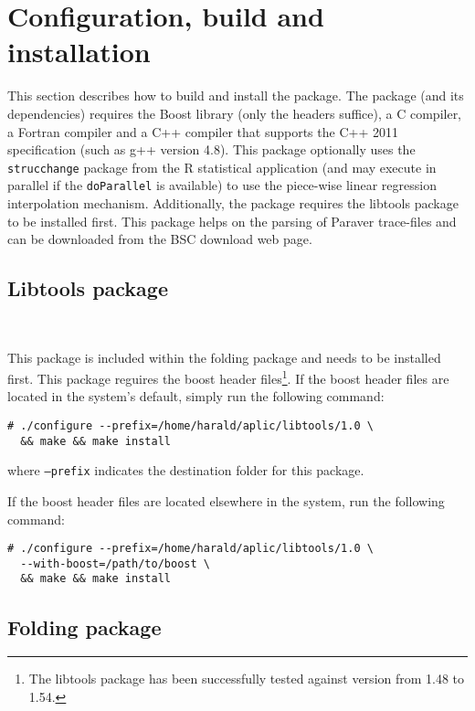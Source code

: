 

\section{Configuration, build and installation}

This section describes how to build and install the \FOLDING package.
The \FOLDING package (and its dependencies) requires the Boost library (only the headers suffice), a C compiler, a Fortran compiler and a C++ compiler that supports the C++ 2011 specification (such as g++ version 4.8).
This package optionally uses the \texttt{strucchange} package from the R statistical application (and may execute in parallel if the \texttt{doParallel} is available) to use the piece-wise linear regression interpolation mechanism.
Additionally, the \FOLDING package requires the libtools package to be installed first.
This package helps on the parsing of Paraver trace-files and can be downloaded from the BSC download web page.

\subsection{Libtools package}~\label{subsec:LibtoolsInstallation}

This package is included within the folding package and needs to be installed first.
This package reguires the boost header files\footnote{The libtools package has been successfully tested against version from 1.48 to 1.54.}.
If the boost header files are located in the system's default, simply run the following command:

\begin{verbatim}
# ./configure --prefix=/home/harald/aplic/libtools/1.0 \
  && make && make install
\end{verbatim}

where \texttt{--prefix} indicates the destination folder for this package.

If the boost header files are located elsewhere in the system, run the following command:

\begin{verbatim}
# ./configure --prefix=/home/harald/aplic/libtools/1.0 \
  --with-boost=/path/to/boost \
  && make && make install
\end{verbatim}

\subsection{Folding package}

